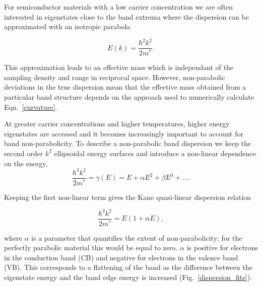 For semiconductor materials with a low carrier concentration we are often interested in eigenstates close to the band extrema where the dispersion can be approximated with an isotropic parabola

\begin{equation} \label{parabolic}
E(k)= \frac{\hbar^2k^2}{2m^*}.
\end{equation}

This approximation leads to an effective mass which is independant of the sampling density and range in reciprocal space.
However, non-parabolic deviations in the true dispersion mean that the effective mass obtained from a particular band structure depends on the approach used to numerically calculate Eqn.\ \ref{curvature}. 

At greater carrier concentrations and higher temperatures, higher energy eigenstates are accessed and it becomes increasingly important to account for band non-parabolicity.\autocite{Ruf1990} 
To describe a non-parabolic band dispersion we keep the second order $k^2$ ellipsoidal energy surfaces and introduce a non-linear dependence on the energy, 
\begin{equation} \label{nonparabolic}
\frac{\hbar^2k^2}{2m^*} = \gamma(E) = E + \alpha E^2 + \beta E^3+ \ldots .
\end{equation}

Keeping the first non-linear term gives the Kane quasi-linear dispersion relation\autocite{Kane1957}

\begin{equation} \label{kane}
\frac{\hbar^2k^2}{2m^*} = E(1 + \alpha E),
\end{equation}

where $\alpha$ is a parameter that quantifies the extent of non-parabolicity; for the perfectly parabolic material this would be equal to zero. 
$\alpha$ is positive for electrons in the conduction band (CB) and negative for electrons in the valence band (VB). 
This corresponds to a flattening of the band as the difference between the eigenstate energy and the band edge energy is increased (Fig.\ \ref{dispersion_fits}).

